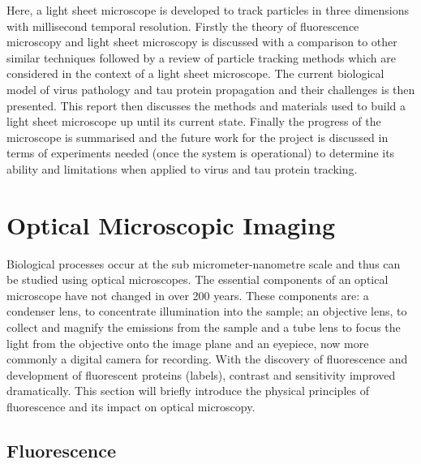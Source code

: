 Here, a light sheet microscope is developed to track particles in three dimensions with millisecond temporal resolution.
Firstly the theory of fluorescence microscopy and light sheet microscopy is discussed with a comparison to other similar techniques followed by a review of particle tracking methods which are considered in the context of a light sheet microscope.
The current biological model of virus pathology and tau protein propagation and their challenges is then presented.
This report then discusses the methods and materials used to build a light sheet microscope up until its current state.
Finally the progress of the microscope is summarised and the future work for the project is discussed in terms of experiments needed (once the system is operational) to determine its ability and limitations when applied to virus and tau protein tracking.

\section{Optical Microscopic Imaging}

Biological processes occur at the sub micrometer-nanometre scale and thus can be studied using optical microscopes\cite{Murphy2012e}.
The essential components of an optical microscope have not changed in over 200 years\cite{Bradbury1998,Masters2001b}.
These components are: a condenser lens, to concentrate illumination into the sample; an objective lens, to collect and magnify the emissions from the sample and a tube lens to focus the light from the objective onto the image plane and an eyepiece, now more commonly a digital camera for recording.
With the discovery of fluorescence and development of fluorescent proteins (labels), contrast and sensitivity improved dramatically.
This section will briefly introduce the physical principles of fluorescence and its impact on optical microscopy.

\subsection{Fluorescence}

